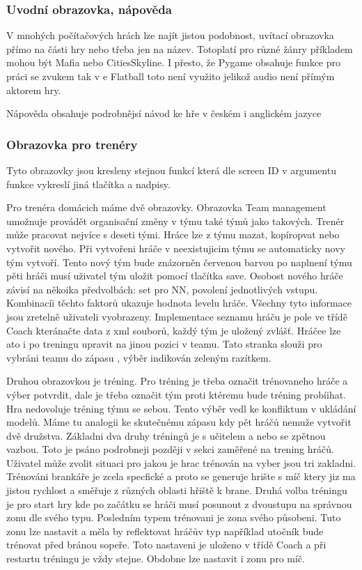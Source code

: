 \documentclass[
  program=ainfk,
  biblatex,
  language=czech,
  figures=true,
  tables ,
  sourcecodes=true,
  glossaries=true,
  index
]{kidiplom}
\begin{document}
 
\subsubsection{Uvodní obrazovka, nápověda } 
 
V mnohých počítačových hrách lze najít jistou podobnost, uvítací obrazovka přímo na části hry nebo třeba jen na název. Totoplatí pro různé žánry příkladem mohou být  Mafia nebo CitiesSkyline. I přesto, že Pygame obsahuje funkce pro práci se zvukem tak v e Flatball toto není využito jelikož audio není přímým aktorem hry.

Nápověda obsahuje podrobnějsí návod ke hře v českém i anglickém jazyce 

 
\subsubsection{Obrazovka pro trenéry} 
Tyto obrazovky jsou kresleny stejnou funkcí která dle screen ID v argumentu funkce vykreslí jiná tlačítka a nadpisy. 
 
Pro trenéra domácich máme dvě obrazovky. Obrazovka Team management umožnuje provádět organisační  změny v  týmu také týmů jako takových. Trenér může pracovat nejvíce s deseti  tými. Hráce lze z týmu mazat, kopíropvat nebo vytvořit nového. Při vytvořeni hráče v neexistujicim týmu se automaticky novy tým vytvoří. Tento nový tým bude znázorněn červenou barvou po naplnení týmu pěti hráči musí uživatel tým uložit pomocí tlačítka save. Osobost nového hráče závisí na někoika předvolbách: set pro NN, povolení jednotlivých vstupu. Kombinacíi těchto faktorů ukazuje hodnota levelu hráče. Všechny tyto informace jsou zretelně uživateli vyobrazeny. Implementace seznamu hráču je pole ve třídě Coach kteránačte data z xml souborů, každý tým je uložený zvlášť. Hráčee lze ato i po treningu upravit  na jinou pozici v teamu. Tato stranka  slouži pro vybráni teamu do zápasu , výběr indikován zeleným razítkem.

Druhou obrazovkou je tréning. Pro tréning je třeba označit trénovaneho hráče a výber potvrdit, dale je třeba označit tým proti ktéremu bude tréning probíihat. Hra nedovoluje tréning týmu se sebou. Tento výběr vedl ke konfliktum v ukládání modelů. Máme tu analogii ke skutečnému zápasu kdy pět hráčů  nemuže vytvořit dvě družstva. Základni dva druhy tréningů je s učitelem a nebo se zpětnou vazbou. Toto je psáno podrobneji později v sekci zaměřené na trening hráčů. Uživatel může zvolit situaci pro jakou je hrac trénován na vyber jsou tri zakladni. Trénováni brankáře je zcela specfické a proto se generuje hrište s míč ktery jiz ma jistou rychlost a směřuje z různých oblasti hřiště k brane. Druhá volba tréningu je pro start hry kde po začátku se hráči musí posunout z dvoustupu na správnou zonu dle svého typu. Posledním typem trénovani je zona svého působeni. Tuto zonu lze nastavit a měla by reflektovat hráčův typ například utočník bude trénovat před bránou sopeře. Toto nastaveni je uloženo v třídě Coach a při restartu tréningu je vždy stejne. Obdobne lze nastavit i zonu pro míč. 
\end{document}
